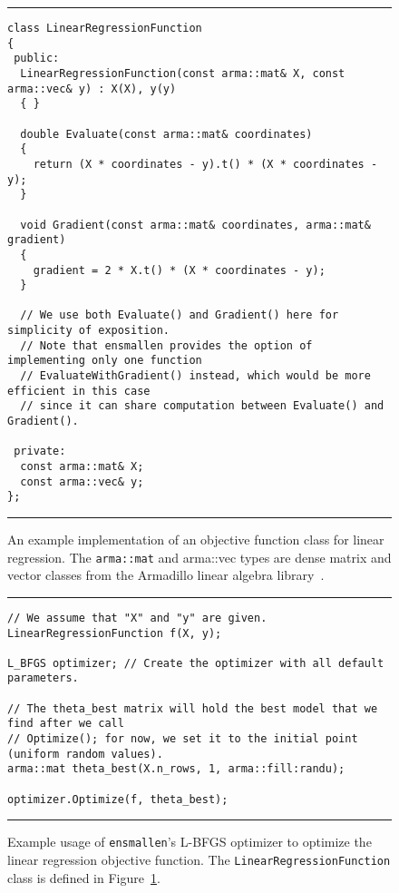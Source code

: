 \begin{figure}[t!]
\hrule
\vspace{1ex}
\begin{verbatim}
class LinearRegressionFunction
{
 public:
  LinearRegressionFunction(const arma::mat& X, const arma::vec& y) : X(X), y(y)
  { }

  double Evaluate(const arma::mat& coordinates)
  {
    return (X * coordinates - y).t() * (X * coordinates - y);
  }

  void Gradient(const arma::mat& coordinates, arma::mat& gradient)
  {
    gradient = 2 * X.t() * (X * coordinates - y);
  }

  // We use both Evaluate() and Gradient() here for simplicity of exposition.
  // Note that ensmallen provides the option of implementing only one function
  // EvaluateWithGradient() instead, which would be more efficient in this case
  // since it can share computation between Evaluate() and Gradient().

 private:
  const arma::mat& X;
  const arma::vec& y;
};
\end{verbatim}
\hrule
\vspace*{-0.5em}
\caption{An example implementation of an objective function class for linear
regression.
The {\tt arma::mat} and {arma::vec} types are 
dense matrix and vector classes
from the Armadillo linear algebra library~\cite{sanderson2016armadillo}.
}
\label{fig:lr_function}
\end{figure}

\begin{figure}[t!]
\hrule
\vspace{1ex}
\begin{verbatim}
// We assume that "X" and "y" are given.
LinearRegressionFunction f(X, y);

L_BFGS optimizer; // Create the optimizer with all default parameters.

// The theta_best matrix will hold the best model that we find after we call
// Optimize(); for now, we set it to the initial point (uniform random values).
arma::mat theta_best(X.n_rows, 1, arma::fill:randu);

optimizer.Optimize(f, theta_best);
\end{verbatim}
\hrule
\vspace*{-0.5em}
\caption{Example usage of {\tt ensmallen}'s L-BFGS optimizer to optimize the
linear regression objective function.
The {\tt LinearRegressionFunction} class is defined in Figure~\ref{fig:lr_function}.
}
\label{fig:lbfgs_lr_opt}
\end{figure}

